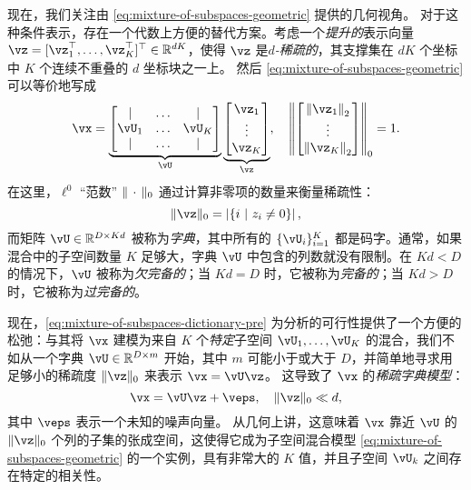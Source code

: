\documentclass[../../book-main_zh.tex]{subfiles}
\begin{document}
现在，我们关注由 \eqref{eq:mixture-of-subspaces-geometric} 提供的几何视角。
对于这种条件表示，存在一个代数上方便的替代方案。考虑一个\textit{提升的}表示向量 $\vz = [\vz_1^\top, \dots, \vz_K^\top]^\top \in \R^{dK}$，使得 $\vz$ 是\textit{$d$-稀疏的}，其支撑集在 $dK$ 个坐标中 $K$ 个连续不重叠的 $d$ 坐标块之一上。
然后 \eqref{eq:mixture-of-subspaces-geometric} 可以等价地写成
\begin{equation}\label{eq:mixture-of-subspaces-dictionary-pre}
    \vx = 
    \underbrace{
    \begin{bmatrix} 
    | & \hdots & |  \\
    \vU_1 & \hdots & \vU_K  \\
    | & \hdots & | 
    \end{bmatrix} 
    }_{\vU}
    \underbrace{
    \begin{bmatrix} \vz_1 \\ \vdots \\ \vz_K \end{bmatrix}
    }_{\vz},
    \quad
    \norm*{
    \begin{bmatrix} \norm*{\vz_1}_2 \\ \vdots \\ \norm*{\vz_K}_2 \end{bmatrix}
    }_0 = 1.
\end{equation}
在这里，$\ell^0$ “范数” $\norm{\,\cdot\,}_0$ 通过计算非零项的数量来衡量稀疏性：
\begin{equation}\label{eq:ell-zero-norm}
    \norm{\vz}_0 = \abs*{\set{i \given z_i \neq 0}},
\end{equation}
而矩阵 $\vU \in \R^{D \times Kd}$ 被称为\textit{字典}，其中所有的 $\{\vU_i\}_{i=1}^K$ 都是码字。通常，如果混合中的子空间数量 $K$ 足够大，字典 $\vU$ 中包含的列数就没有限制。在 $Kd < D$ 的情况下，$\vU$ 被称为\textit{欠完备的}；当 $Kd = D$ 时，它被称为\textit{完备的}；当 $Kd > D$ 时，它被称为\textit{过完备的}。

现在，\eqref{eq:mixture-of-subspaces-dictionary-pre} 为分析的可行性提供了一个方便的松弛：与其将 $\vx$ 建模为来自 $K$ 个\textit{特定}子空间 $\vU_1, \dots, \vU_K$ 的混合，我们不如从一个字典 $\vU \in \R^{D \times m}$ 开始，其中 $m$ 可能小于或大于 $D$，并简单地寻求用足够小的稀疏度 $\norm{\vz}_0$ 来表示 $\vx = \vU \vz$。
这导致了 $\vx$ 的\textit{稀疏字典模型}：
\begin{equation}\label{eq:mixture-of-subspaces-dictionary}
    \vx =  \vU \vz + \veps,
    \quad
    \norm{\vz}_0 \ll d,
\end{equation}
其中 $\veps$ 表示一个未知的噪声向量。
从几何上讲，这意味着 $\vx$ 靠近 $\vU$ 的 $\norm{\vz}_0$ 个列的子集的张成空间，这使得它成为子空间混合模型 \eqref{eq:mixture-of-subspaces-geometric} 的一个实例，具有非常大的 $K$ 值，并且子空间 $\vU_k$ 之间存在特定的相关性。
\end{document}
